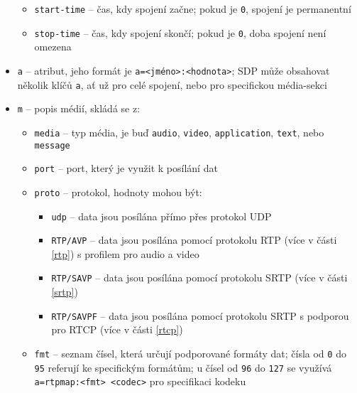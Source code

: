\begin{itemize}
\begin{itemize}
              \item \texttt{start-time} -- čas, kdy spojení začne; pokud je
                    \texttt{0}, spojení je permanentní
              \item \texttt{stop-time} -- čas, kdy spojení skončí; pokud je
                    \texttt{0}, doba spojení není omezena
          \end{itemize}
    \item \texttt{a} -- atribut, jeho formát je
          \texttt{a=<jméno>:<hodnota>}; SDP může obsahovat několik
          klíčů \texttt{a}, ať už pro celé spojení, nebo pro
          specifickou média-sekci
    \item \texttt{m} -- popis médií, skládá se z:
          \begin{itemize}
              \item \texttt{media} -- typ média, je buď
                    \texttt{audio}, \texttt{video},
                    \texttt{application}, \texttt{text},
                    nebo \texttt{message}
              \item \texttt{port} -- port, který je využit k posílání
                    dat
              \item \texttt{proto} -- protokol, hodnoty mohou být:
                    \begin{itemize}
                        \item \texttt{udp} -- data jsou posílána přímo
                              přes protokol UDP
                        \item \texttt{RTP/AVP} -- data jsou posílána
                              pomocí protokolu RTP (více v části \ref{rtp}) s
                              profilem pro audio a video
                        \item \texttt{RTP/SAVP} -- data jsou posílána
                              pomocí protokolu SRTP (více v části \ref{srtp})
                        \item \texttt{RTP/SAVPF} -- data jsou posílána
                              pomocí protokolu SRTP s podporou pro RTCP (více v
                              části \ref{rtcp})
                    \end{itemize}
              \item \texttt{fmt} -- seznam čísel, která určují
                    podporované formáty dat; čísla od \texttt{0} do
                    \texttt{95} referují ke specifickým formátům; u
                    čísel od \texttt{96} do \texttt{127} se
                    využívá \texttt{a=rtpmap:<fmt> <codec>} pro
                    specifikaci kodeku
          \end{itemize}
\end{itemize}

